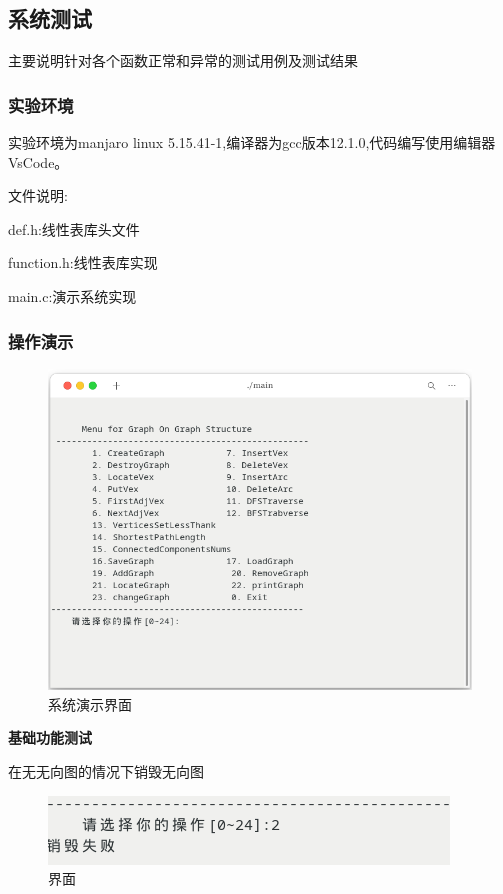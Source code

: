 \documentclass[supercite]{Experimental_Report}
\theoremstyle{definition}
\begin{document}
\subsection{系统测试}

主要说明针对各个函数正常和异常的测试用例及测试结果

\subsubsection{实验环境}

实验环境为manjaro linux 5.15.41-1,编译器为gcc版本12.1.0,代码编写使用编辑器VsCode。

文件说明:

def.h:线性表库头文件

function.h:线性表库实现

main.c:演示系统实现

\subsubsection{操作演示}

\begin{figure}[htb]
	\begin{center}
		\includegraphics[scale=0.60]{images/2-2.png}
		\caption{系统演示界面}
		\label{fig2-2}
	\end{center}
\end{figure}

\textbf{基础功能测试}

在无无向图的情况下销毁无向图

\begin{figure}[!htb]
	\begin{center}
		\includegraphics[scale=0.60]{images/2-3.png}
		\caption{界面}
		\label{fig2-3}
		\end{center}
\end{figure}
\end{document}

